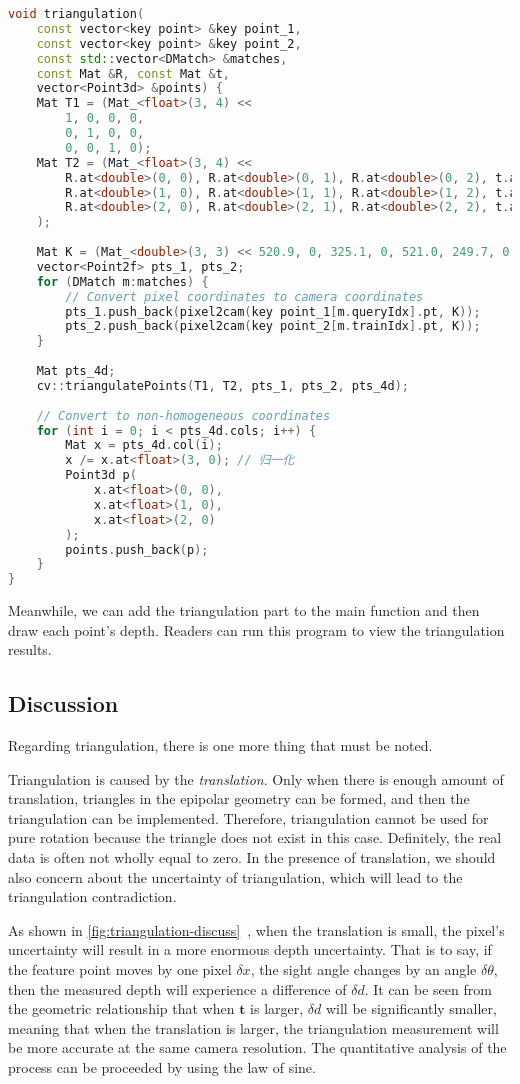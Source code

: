 \begin{lstlisting}[language=c++,caption=slambook2/ch7/triangulation.cpp (part)]
void triangulation(
	const vector<key point> &key point_1,
	const vector<key point> &key point_2,
	const std::vector<DMatch> &matches,
	const Mat &R, const Mat &t,
	vector<Point3d> &points) {
	Mat T1 = (Mat_<float>(3, 4) <<
		1, 0, 0, 0,
		0, 1, 0, 0,
		0, 0, 1, 0);
	Mat T2 = (Mat_<float>(3, 4) <<
		R.at<double>(0, 0), R.at<double>(0, 1), R.at<double>(0, 2), t.at<double>(0, 0),
		R.at<double>(1, 0), R.at<double>(1, 1), R.at<double>(1, 2), t.at<double>(1, 0),
		R.at<double>(2, 0), R.at<double>(2, 1), R.at<double>(2, 2), t.at<double>(2, 0)
	);
	
	Mat K = (Mat_<double>(3, 3) << 520.9, 0, 325.1, 0, 521.0, 249.7, 0, 0, 1);
	vector<Point2f> pts_1, pts_2;
	for (DMatch m:matches) {
		// Convert pixel coordinates to camera coordinates
		pts_1.push_back(pixel2cam(key point_1[m.queryIdx].pt, K));
		pts_2.push_back(pixel2cam(key point_2[m.trainIdx].pt, K));
	}
	
	Mat pts_4d;
	cv::triangulatePoints(T1, T2, pts_1, pts_2, pts_4d);
	
	// Convert to non-homogeneous coordinates
	for (int i = 0; i < pts_4d.cols; i++) {
		Mat x = pts_4d.col(i);
		x /= x.at<float>(3, 0); // 归一化
		Point3d p(
			x.at<float>(0, 0),
			x.at<float>(1, 0),
			x.at<float>(2, 0)
		);
		points.push_back(p);
	}
}
\end{lstlisting}

Meanwhile, we can add the triangulation part to the main function and then draw each point's depth. Readers can run this program to view the triangulation results.

\subsection{Discussion}
Regarding triangulation, there is one more thing that must be noted.

Triangulation is caused by the \textit{translation}. Only when there is enough amount of translation, triangles in the epipolar geometry can be formed, and then the triangulation can be implemented. Therefore, triangulation cannot be used for pure rotation because the triangle does not exist in this case. Definitely, the real data is often not wholly equal to zero. In the presence of translation, we should also concern about the uncertainty of triangulation, which will lead to the triangulation contradiction.

As shown in \autoref{fig:triangulation-discuss}~, when the translation is small, the pixel's uncertainty will result in a more enormous depth uncertainty. That is to say, if the feature point moves by one pixel $\delta x$, the sight angle changes by an angle $\delta \theta$, then the measured depth will experience a difference of $\delta d$. It can be seen from the geometric relationship that when $\mathbf{t}$ is larger, $\delta d$ will be significantly smaller, meaning that when the translation is larger, the triangulation measurement will be more accurate at the same camera resolution. The quantitative analysis of the process can be proceeded by using the law of sine.

